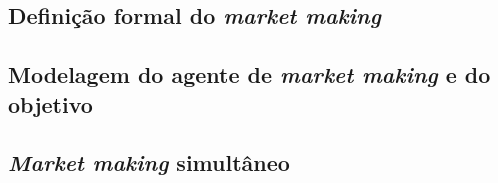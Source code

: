\subsection{Definição formal do \textit{market making}}
\label{section:problem_description/definition}


\subsection{Modelagem do agente de \textit{market making} e do objetivo}
\label{section:problem_description/modeling}


\subsection{\textit{Market making} simultâneo}
\label{section:problem_description/multivariate_mm}
